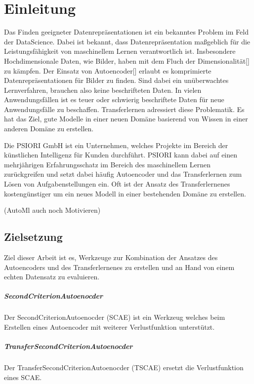 \listoftodos

\chapter{Einleitung}
\label{chap:Einleitung}
	Das Finden geeigneter Datenrepräsentationen ist ein bekanntes Problem im Feld der DataScience. Dabei ist bekannt, dass Datenrepräsentation maßgeblich für die Leistungsfähigkeit von maschinellem Lernen verantwortlich ist. Insbesondere Hochdimensionale Daten, wie Bilder, haben mit dem Fluch der Dimensionalität[] zu kämpfen. Der Einsatz von Autoencoder[] erlaubt es komprimierte Datenrepräsentationen für Bilder zu finden. Sind dabei ein unüberwachtes Lernverfahren, brauchen also keine beschrifteten Daten.
	In vielen Anwendungsfällen ist es teuer oder schwierig beschriftete Daten für neue Anwendungsfälle zu beschaffen. Transferlernen adressiert diese Problematik. Es hat das Ziel, gute Modelle in einer neuen Domäne basierend von Wissen in einer anderen Domäne zu erstellen.
	
	Die PSIORI GmbH \cite{PSIORIGmbH.2020} ist ein Unternehmen, welches Projekte im Bereich der künstlichen Intelligenz für Kunden durchführt. PSIORI kann dabei auf einen mehrjährigen Erfahrungsschatz im Bereich des maschinellem Lernen zurückgreifen und setzt dabei häufig Autoencoder und das Transferlernen zum Lösen von Aufgabenstellungen ein. Oft ist der Ansatz des Transferlernenes kostengünstiger um ein neues Modell in einer bestehenden Domäne zu erstellen. 

 	(AutoMl auch noch Motivieren)

	\section{Zielsetzung}
	\label{sec:Zielsetzung}
	Ziel dieser Arbeit ist es, Werkzeuge zur Kombination der Ansatzes des Autoencoders und des Transferlernenes zu erstellen und an Hand von einem echten Datensatz zu evaluieren.
	\paragraph{SecondCriterionAutoenocder} Der SecondCriterionAutoenocder (SCAE) ist ein Werkzeug welches beim Erstellen eines Autoencoder mit weiterer Verlustfunktion unterstützt.  
    \paragraph{TransferSecondCriterionAutoenocder} Der TransferSecondCriterionAutoenocder (TSCAE) ersetzt die Verlustfunktion eines SCAE.
